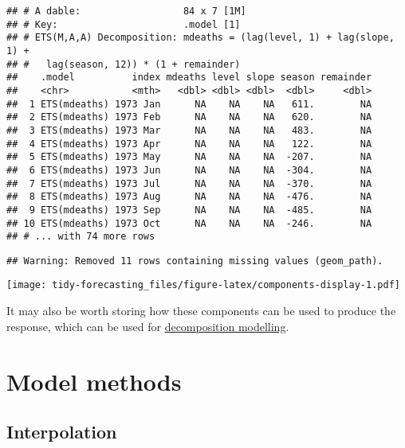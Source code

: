 \documentclass[]{book}
\newenvironment{Shaded}{\begin{snugshade}}{\end{snugshade}}
\newcommand{\KeywordTok}[1]{\textcolor[rgb]{0.13,0.29,0.53}{\textbf{#1}}}
\newcommand{\NormalTok}[1]{#1}
\newcommand{\OperatorTok}[1]{\textcolor[rgb]{0.81,0.36,0.00}{\textbf{#1}}}
\newcommand{\StringTok}[1]{\textcolor[rgb]{0.31,0.60,0.02}{#1}}
\begin{document}
\begin{Shaded}
\end{Shaded}

\begin{verbatim}
## # A dable:                  84 x 7 [1M]
## # Key:                      .model [1]
## # ETS(M,A,A) Decomposition: mdeaths = (lag(level, 1) + lag(slope, 1) +
## #   lag(season, 12)) * (1 + remainder)
##    .model          index mdeaths level slope season remainder
##    <chr>           <mth>   <dbl> <dbl> <dbl>  <dbl>     <dbl>
##  1 ETS(mdeaths) 1973 Jan      NA    NA    NA   611.        NA
##  2 ETS(mdeaths) 1973 Feb      NA    NA    NA   620.        NA
##  3 ETS(mdeaths) 1973 Mar      NA    NA    NA   483.        NA
##  4 ETS(mdeaths) 1973 Apr      NA    NA    NA   122.        NA
##  5 ETS(mdeaths) 1973 May      NA    NA    NA  -207.        NA
##  6 ETS(mdeaths) 1973 Jun      NA    NA    NA  -304.        NA
##  7 ETS(mdeaths) 1973 Jul      NA    NA    NA  -370.        NA
##  8 ETS(mdeaths) 1973 Aug      NA    NA    NA  -476.        NA
##  9 ETS(mdeaths) 1973 Sep      NA    NA    NA  -485.        NA
## 10 ETS(mdeaths) 1973 Oct      NA    NA    NA  -246.        NA
## # ... with 74 more rows
\end{verbatim}

\begin{verbatim}
## Warning: Removed 11 rows containing missing values (geom_path).
\end{verbatim}

\texttt{[image: tidy-forecasting\_files/figure-latex/components-display-1.pdf]}

It may also be worth storing how these components can be used to produce the response, which can be used for \href{https://mitchelloharawild.github.io/tidy-forecasting-principles/advanced.html\#decomposition}{decomposition modelling}.

\hypertarget{methods}{%
\chapter{Model methods}\label{methods}}

\hypertarget{interpolation}{%
\section{Interpolation}\label{interpolation}}
\end{document}
